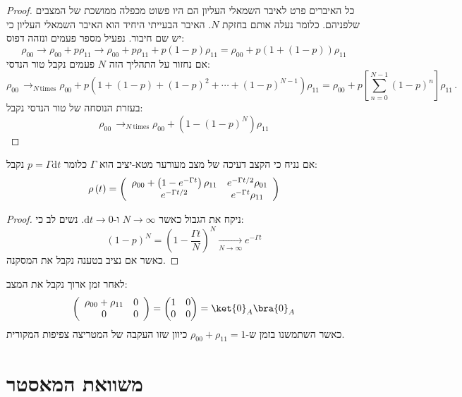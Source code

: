 \documentclass{tstextbook}
\begin{document}
\begin{proof}
כל האיברים פרט לאיבר השמאלי העליון הם היו פשוט מכפלה ממושכת של המצבים שלפניהם. כלומר נעלה אותם בחזקת \(N\). האיבר הבעייתי היחיד הוא האיבר השמאלי העליון כי יש שם חיבור. נפעיל מספר פעמים ונזהה דפוס:
$$\rho_{00}\longrightarrow\rho_{00}+p\rho_{11}\longrightarrow\rho_{00}+p\rho_{11}+p\left(1-p\right)\rho_{11}=\rho_{00}+p\left(1+\left(1-p\right)\right)\rho_{11}$$
אם נחזור על התהליך הזה \(N\) פעמים נקבל טור הנדסי:
$$\rho_{00}\,\mathop{\longrightarrow}_{N\,\mathrm{times}}\rho_{00}+p\left(1+\left(1-p\right)+\left(1-p\right)^{2}+\cdots+\left(1-p\right)^{N-1}\right)\rho_{11}=\rho_{00}+p\left[\sum_{n=0}^{N-1}\left(1-p\right)^{n}\right]\rho_{11}\,.$$
בעזרת הנוסחה של טור הנדסי נקבל:
$$\rho_{00}\,\mathop{\longrightarrow}_{N\mathrm{~times}}\rho_{00}+\left(1-\left(1-p\right)^{N}\right)\rho_{11}$$

\end{proof}
\begin{corollary}
אם נניח כי הקצב דעיכה של מצב מעורער מטא-יציב הוא \(\Gamma\) כלומר \(p=\Gamma \mathrm{d}t\) נקבל:
$$\rho\left(t\right)=\left(\begin{array}{c c}{{\rho_{00}+\left(1-e^{-\Gamma t}\right)\rho_{11}}}&{{e^{-\Gamma t/2}\rho_{01}}}\\ {{e^{-\Gamma t/2}}}&{{e^{-\Gamma t}\rho_{11}}}\end{array}\right)$$

\end{corollary}
\begin{proof}
ניקח את הגבול כאשר \(N\to \infty\) ו-\(\mathrm{d}t\to 0\). נשים לב כי:
$$\left(1-p\right)^{N}=\left(1-{\frac{\Gamma t}{N}}\right)^{N}\underset{N\longrightarrow\infty}{\longrightarrow}e^{-\Gamma t}$$
כאשר אם נציב בטענה נקבל את המסקנה.

\end{proof}
\begin{corollary}
לאחר זמן ארוך נקבל את המצב:
$$\left(\begin{array}{c c}{{\rho_{00}+\rho_{11}}}&{{0}}\\ {{0}}&{{0}}\end{array}\right)=\begin{pmatrix}1 & 0 \\0 & 0
\end{pmatrix}=\ket{0} _{A}\bra{0}_{A}$$
כאשר השתמשנו בזמן ש-\(\rho_{00}+\rho_{11}=1\) כיוון שזו העקבה של המטריצה צפיפות המקורית.

\end{corollary}
\section{משוואת המאסטר}
\end{document}
